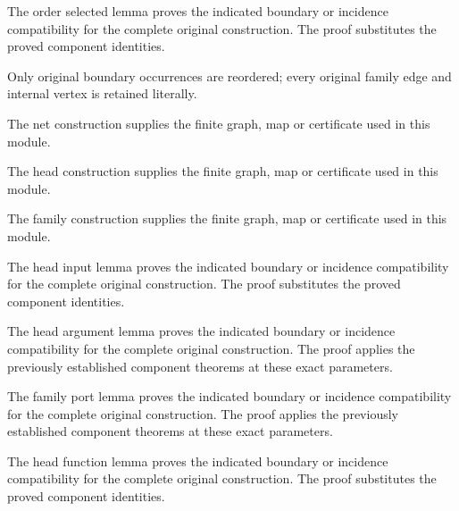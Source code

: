 The order selected lemma proves the indicated boundary or incidence compatibility for the complete original construction.
The proof substitutes the proved component identities.
\par{}

Only original boundary occurrences are reordered; every original family
edge and internal vertex is retained literally.
\par{}

The net construction supplies the finite graph, map or certificate used in this module.
\par{}

The head construction supplies the finite graph, map or certificate used in this module.
\par{}

The family construction supplies the finite graph, map or certificate used in this module.
\par{}

The head input lemma proves the indicated boundary or incidence compatibility for the complete original construction.
The proof substitutes the proved component identities.
\par{}

The head argument lemma proves the indicated boundary or incidence compatibility for the complete original construction.
The proof applies the previously established component theorems at these exact parameters.
\par{}

The family port lemma proves the indicated boundary or incidence compatibility for the complete original construction.
The proof applies the previously established component theorems at these exact parameters.
\par{}

The head function lemma proves the indicated boundary or incidence compatibility for the complete original construction.
The proof substitutes the proved component identities.
\par{}

